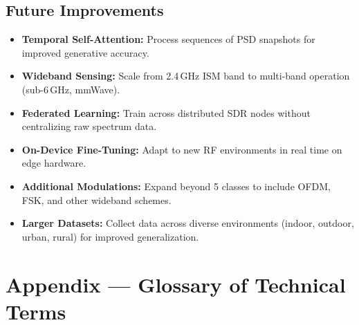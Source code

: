 \documentclass[12pt,a4paper]{article}
\begin{document}
\subsection{Future Improvements}
\begin{itemize}[leftmargin=1.5em]
\item \textbf{Temporal Self-Attention:} Process sequences of PSD snapshots for improved generative accuracy.
\item \textbf{Wideband Sensing:} Scale from 2.4\,GHz ISM band to multi-band operation (sub-6\,GHz, mmWave).
\item \textbf{Federated Learning:} Train across distributed SDR nodes without centralizing raw spectrum data.
\item \textbf{On-Device Fine-Tuning:} Adapt to new RF environments in real time on edge hardware.
\item \textbf{Additional Modulations:} Expand beyond 5 classes to include OFDM, FSK, and other wideband schemes.
\item \textbf{Larger Datasets:} Collect data across diverse environments (indoor, outdoor, urban, rural) for improved generalization.
\end{itemize}

\section{Appendix --- Glossary of Technical Terms}
\end{document}
